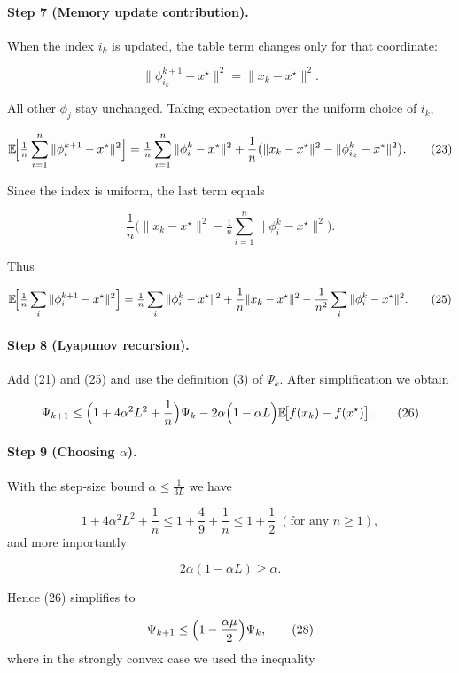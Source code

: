 \documentclass{article}
\newcommand{\E}{\mathbb{E}}
\begin{document}
\paragraph{Step 7 (Memory update contribution).}
When the index \(i_k\) is updated, the table term changes only for that
coordinate:

\[
\|\phi_{i_k}^{k+1}-x^{\star}\|^{2}
 =\|x_k-x^{\star}\|^{2}.
\tag{22}
\]

All other \(\phi_j\) stay unchanged. Taking expectation over the uniform
choice of \(i_k\),

\[
\E\!\Bigl[\tfrac{1}{n}\sum_{i=1}^{n}\|\phi_i^{k+1}-x^{\star}\|^{2}\Bigr]
 =\tfrac{1}{n}\sum_{i=1}^{n}\|\phi_i^{k}-x^{\star}\|^{2}
   +\frac{1}{n}\bigl(\|x_k-x^{\star}\|^{2}
        -\|\phi_{i_k}^{k}-x^{\star}\|^{2}\bigr).
\tag{23}
\]

Since the index is uniform, the last term equals  

\[
\frac{1}{n}\bigl(\|x_k-x^{\star}\|^{2}
        -\tfrac{1}{n}\sum_{i=1}^{n}\|\phi_i^{k}-x^{\star}\|^{2}\bigr).
\tag{24}
\]

Thus

\[
\E\!\Bigl[\tfrac{1}{n}\sum_{i}\|\phi_i^{k+1}-x^{\star}\|^{2}\Bigr]
 =\tfrac{1}{n}\sum_{i}\|\phi_i^{k}-x^{\star}\|^{2}
   +\frac{1}{n}\|x_k-x^{\star}\|^{2}
   -\frac{1}{n^{2}}\sum_{i}\|\phi_i^{k}-x^{\star}\|^{2}.
\tag{25}
\]

\paragraph{Step 8 (Lyapunov recursion).}
Add (21) and (25) and use the definition (3) of \(\Psi_k\). After simplification we obtain

\[
\Psi_{k+1}
\le\Bigl(1+4\alpha^{2}L^{2}+\frac{1}{n}\Bigr)\Psi_k
   -2\alpha\Bigl(1-\alpha L\Bigr)\E\!\bigl[f(x_k)-f(x^{\star})\bigr].
\tag{26}
\]

\paragraph{Step 9 (Choosing \(\alpha\)).}
With the step‑size bound \(\alpha\le \frac{1}{3L}\) we have  

\[
1+4\alpha^{2}L^{2}+\frac{1}{n}\le 1+\frac{4}{9}+\frac{1}{n}
\le 1+\frac{1}{2}\;(\text{for any }n\ge 1),
\]
and more importantly  

\[
2\alpha(1-\alpha L)\ge \alpha.
\tag{27}
\]

Hence (26) simplifies to

\[
\Psi_{k+1}\le\Bigl(1-\frac{\alpha\mu}{2}\Bigr)\Psi_k,
\tag{28}
\]
where in the strongly convex case we used the inequality  
\end{document}
